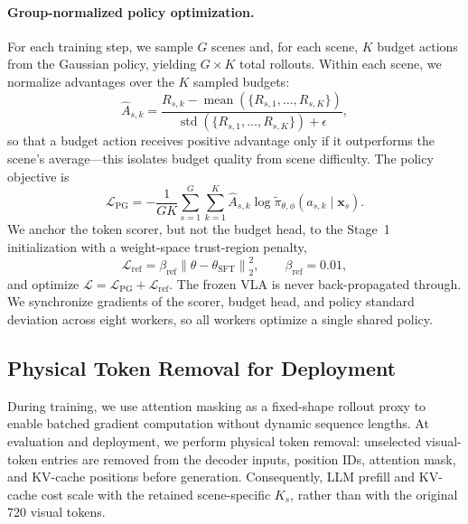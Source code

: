 \documentclass[letterpaper]{article} %
\begin{document}
\paragraph{Group-normalized policy optimization.}
For each training step, we sample $G$ scenes and, for each scene, $K$ budget
actions from the Gaussian policy, yielding $G{\times}K$ total rollouts.
Within each scene, we normalize advantages over the $K$ sampled budgets:
\begin{equation}
\widehat{A}_{s,k} =
\frac{R_{s,k}-\operatorname{mean}(\{R_{s,1},\ldots,R_{s,K}\})}
{\operatorname{std}(\{R_{s,1},\ldots,R_{s,K}\})+\epsilon},
\end{equation}
so that a budget action receives positive advantage only if it outperforms the
scene's average---this isolates budget quality from scene difficulty.
The policy objective is
\begin{equation}
\mathcal{L}_{\mathrm{PG}}
=
-\frac{1}{GK}\sum_{s=1}^{G}\sum_{k=1}^{K}
\widehat{A}_{s,k}
\log\widetilde{\pi}_{\theta,\phi}(a_{s,k}\mid\mathbf{x}_s).
\label{eq:pg}
\end{equation}
We anchor the token scorer, but not the budget head, to the Stage~1
initialization with a weight-space trust-region penalty,
\begin{equation}
\mathcal{L}_{\mathrm{ref}} =
\beta_{\mathrm{ref}}
\left\|\theta-\theta_{\mathrm{SFT}}\right\|_2^2,
\qquad \beta_{\mathrm{ref}}=0.01,
\end{equation}
and optimize
$\mathcal{L}=\mathcal{L}_{\mathrm{PG}}+\mathcal{L}_{\mathrm{ref}}$.
The frozen VLA is never back-propagated through. We synchronize gradients of
the scorer, budget head, and policy standard deviation across eight workers, so
all workers optimize a single shared policy.


\subsection{Physical Token Removal for Deployment}
\label{sec:token-drop}

During training, we use attention masking as a fixed-shape rollout proxy to
enable batched gradient computation without dynamic sequence lengths. At
evaluation and deployment, we perform physical token removal: unselected
visual-token entries are removed from the decoder inputs, position IDs,
attention mask, and KV-cache positions before generation. Consequently, LLM
prefill and KV-cache cost scale with the retained scene-specific $K_s$, rather
than with the original 720 visual tokens.
\end{document}
